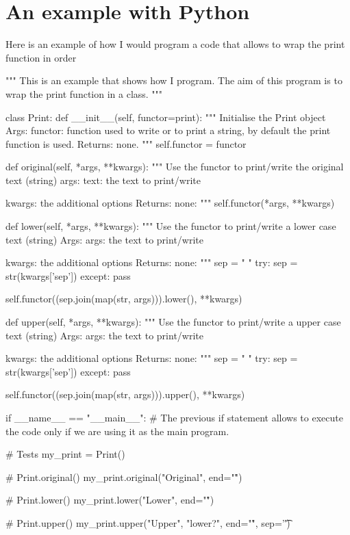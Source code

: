 \documentclass[english, 12 pt, openany, oneside]{book}
\begin{document}
\section{An example with Python}
Here is an example of how I would program a code that allows to wrap the print function in order

\begin{pyblock}[][breaklines]
"""
This is an example that shows how I program.
The aim of this program is to wrap the print function in a class.
"""

class Print:
	def __init__(self, functor=print):
		""" Initialise the Print object
			Args:
				functor:
				function used to write or to print a string, by default the print function is used.
			Returns:
			none.
		"""
		self.functor = functor
		
	def original(self, *args, **kwargs):
		""" Use the functor to print/write the original text (string)
			args:
				text:
				the text to print/write

				kwargs:
				the additional options
			Returns:
			none:			
		"""
		self.functor(*args, **kwargs)
	
	def lower(self, *args, **kwargs):
		""" Use the functor to print/write a lower case text (string)
			Args:
				args:
				the text to print/write

				kwargs:
				the additional options
			Returns:
			none:	
		"""
		sep = " "
		try:
			sep = str(kwargs['sep'])
		except:
			pass

		self.functor((sep.join(map(str, args))).lower(), **kwargs)
		
	def upper(self, *args, **kwargs):
		""" Use the functor to print/write a upper case text (string)
			Args:
				args:
				the text to print/write

				kwargs:
				the additional options
			Returns:
			none:	
		"""
		sep = " "
		try:
			sep = str(kwargs['sep'])
		except:
			pass

		self.functor((sep.join(map(str, args))).upper(), **kwargs)
		
if __name__ == "__main__":
	# The previous if statement allows to execute the code only if we are using it as the main program.
	
	# Tests
	my_print = Print()
	
	# Print.original()
	my_print.original("Original", end="\n\r")
	
	# Print.lower()
	my_print.lower("Lower", end="\n\r")
	
	# Print.upper()
	my_print.upper("Upper", "lower?", end="\n\r", sep='\t')
\end{pyblock}
\end{document}

